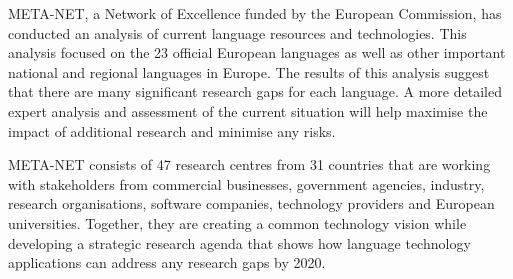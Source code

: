 \documentclass[]{../../metanetpaper}
\begin{document}
\begin{Parallel}[c]{78mm}{78mm}
{META-NET, a Network of Excellence funded by the European Commission, has
conducted an analysis of current language resources and technologies. This
analysis focused on the 23 official European languages as well as other
important national and regional languages in Europe. The results of this
analysis suggest that there are many significant research gaps for each
language. A more detailed expert analysis and assessment of the current
situation will help maximise the impact of additional research and minimise any
risks.

META-NET consists of 47 research centres from 31 countries that are working
with stakeholders from commercial businesses, government agencies, industry,
research organisations, software companies, technology providers and European
universities. Together, they are creating a common technology vision while
developing a strategic research agenda that shows how language technology
applications can address any research gaps by 2020.
}

\ParallelPar
\end{Parallel}
\cleardoublepage


\tableofcontents


\cleardoublepage


\setcounter{page}{1}
\pagestyle{scrheadings}





\end{document}

